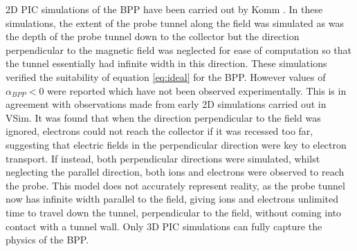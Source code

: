 2D PIC simulations of the BPP have been carried out by Komm \cite{BPP-PIC}. In these simulations, the extent of the probe tunnel along the field was simulated as was the depth of the probe tunnel down to the collector but the direction perpendicular to the magnetic field was neglected for ease of computation so that the tunnel essentially had infinite width in this direction. These simulations verified the suitability of equation \ref{eq:ideal} for the BPP. However values of $\alpha_{BPP} <0$ were reported which have not been observed experimentally. This is in agreement with observations made from early 2D simulations carried out in VSim. It was found that when the direction perpendicular to the field was ignored, electrons could not reach the collector if it was recessed too far, suggesting that electric fields in the perpendicular direction were key to electron transport. If instead, both perpendicular directions were simulated, whilst neglecting the parallel direction, both ions and electrons were observed to reach the probe. This model does not accurately represent reality, as the probe tunnel now has infinite width parallel to the field, giving ions and electrons unlimited time to travel down the tunnel, perpendicular to the field, without coming into contact with a tunnel wall. Only 3D PIC simulations can fully capture the physics of the BPP.

